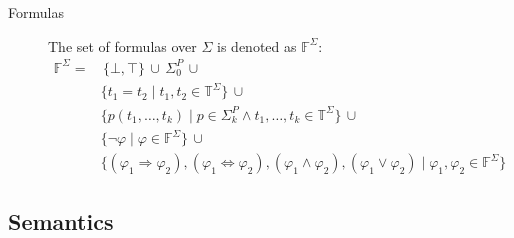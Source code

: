 \begin{description}
    \item[Formulas] 
        The set of formulas over $\Sigma$ is denoted as $\mathbb{F}^\Sigma$:
        \[ 
            \begin{split}
                \mathbb{F}^\Sigma = &\,
                    \{ \bot, \top \} \,\cup\, \Sigma^P_0 \,\cup \\
                    &\{ t_1 = t_2 \mid t_1, t_2 \in \mathbb{T}^\Sigma \} \,\cup \\
                    & \{ p(t_1, \dots, t_k) \mid p \in \Sigma^P_k \land t_1, \dots, t_k \in \mathbb{T}^\Sigma \} \,\cup \\
                    & \{ \lnot \varphi \mid \varphi \in \mathbb{F}^\Sigma \} \,\cup \\
                    & \{ (\varphi_1 \Rightarrow \varphi_2), (\varphi_1 \iff \varphi_2), (\varphi_1 \land \varphi_2), (\varphi_1 \vee \varphi_2) \mid \varphi_1, \varphi_2 \in \mathbb{F}^\Sigma \}
            \end{split}
        \]
\end{description}


\subsection{Semantics}

